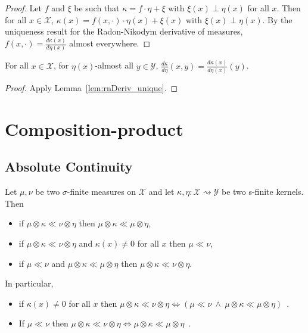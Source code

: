 \begin{proof}\mathlibok
Let $f$ and $\xi$ be such that $\kappa = f \cdot \eta + \xi$ with $\xi(x) \perp \eta(x)$ for all $x$. Then for all $x \in \mathcal X$, $\kappa(x) = f(x, \cdot) \cdot \eta(x) + \xi(x)$ with $\xi(x) \perp \eta(x)$. By the uniqueness result for the Radon-Nikodym derivative of measures, $f(x, \cdot) = \frac{d \kappa(x)}{d \eta(x)}$ almost everywhere.
\end{proof}


\begin{corollary}
  \label{cor:rnDeriv_value}
  \mathlibok
  For all $x \in \mathcal X$, for $\eta(x)$-almost all $y \in \mathcal Y$, $\frac{d \kappa}{d \eta}(x, y) = \frac{d \kappa(x)}{d \eta(x)}(y)$.
\end{corollary}

\begin{proof}\mathlibok
{}
Apply Lemma~\ref{lem:rnDeriv_unique}.
\end{proof}



\section{Composition-product}

\subsection{Absolute Continuity}

\begin{lemma}
  \label{lem:ac_compProd_iff}
  \mathlibok
  Let $\mu, \nu$ be two $\sigma$-finite measures on $\mathcal X$ and let $\kappa, \eta : \mathcal X \rightsquigarrow \mathcal Y$ be two s-finite kernels. Then
  \begin{itemize}
    \item[(1a)] if $\mu \otimes \kappa \ll \nu \otimes \eta$ then $\mu \otimes \kappa \ll \mu \otimes \eta$,
    \item[(1b)] if $\mu \otimes \kappa \ll \nu \otimes \eta$ and $\kappa(x) \ne 0$ for all $x$ then $\mu \ll \nu$,
    \item[(2)]  if $\mu \ll \nu$ and $\mu \otimes \kappa \ll \mu \otimes \eta$ then $\mu \otimes \kappa \ll \nu \otimes \eta$.
  \end{itemize}
  In particular,
  \begin{itemize}
    \item if $\kappa(x) \ne 0$ for all $x$ then
      $\mu \otimes \kappa \ll \nu \otimes \eta \iff \left( \mu \ll \nu \ \wedge \ \mu \otimes \kappa \ll \mu \otimes \eta \right)$~.
    \item If $\mu \ll \nu$ then $\mu \otimes \kappa \ll \nu \otimes \eta \iff \mu \otimes \kappa \ll \mu \otimes \eta$~.
  \end{itemize}
  
\end{lemma}

